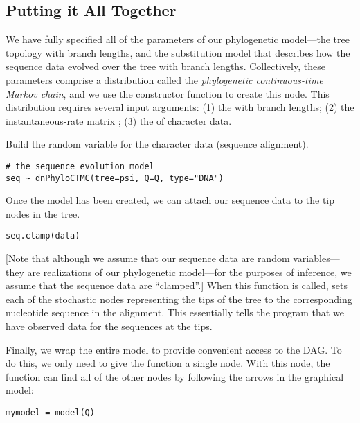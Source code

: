 \subsection{Putting it All Together}

We have fully specified all of the parameters of our phylogenetic model---the tree topology with branch lengths, and the substitution model that describes how the sequence data evolved over the tree with branch lengths.  
Collectively, these parameters comprise a distribution called the \textit{phylogenetic continuous-time Markov chain}, and we use the  constructor function to create this node.
This distribution requires several input arguments: 
(1) the  with branch lengths; 
(2) the instantaneous-rate matrix ;
(3) the  of character data.


Build the random variable for the character data (sequence alignment).
{\tt \begin{snugshade*}
\begin{lstlisting}
# the sequence evolution model
seq ~ dnPhyloCTMC(tree=psi, Q=Q, type="DNA")
\end{lstlisting}
\end{snugshade*}}


Once the  model has been created, we can attach our sequence data to the tip nodes in the tree.
{\tt \begin{snugshade*}
\begin{lstlisting}
seq.clamp(data)
\end{lstlisting}
\end{snugshade*}}
[Note that although we assume that our sequence data are random variables---they are realizations of our phylogenetic model---for the purposes of inference, we assume that the sequence data are ``clamped''.]
When this function is called, \RevBayes sets each of the stochastic nodes representing the tips of the tree to the corresponding nucleotide sequence in the alignment. 
This essentially tells the program that we have observed data for the sequences at the tips. 

Finally, we wrap the entire model to provide convenient access to the DAG. 
To do this, we only need to give the  function a single node. 
With this node, the  function can find all of the other nodes by following the arrows in the graphical model:
{\tt \begin{snugshade*}
\begin{lstlisting}
mymodel = model(Q)
\end{lstlisting}
\end{snugshade*}}

